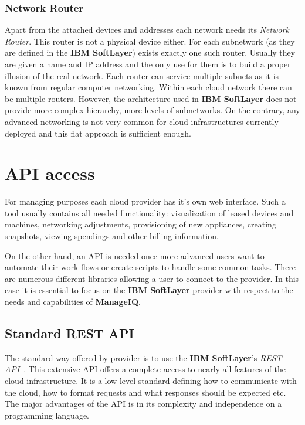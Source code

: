 \subsubsection{Network Router}
\label{subs:Network Router}

Apart from the attached devices and addresses each network needs its \emph{Network Router}. This router is not a physical device either. For each subnetwork (as they are defined in the \textbf{IBM SoftLayer}) exists exactly one such router. Usually they are given a name and IP address and the only use for them is to build a proper illusion of the real network. Each router can service multiple subnets as it is known from regular computer networking. Within each cloud network there can be multiple routers. However, the architecture used in \textbf{IBM SoftLayer} does not provide more complex hierarchy, more levels of subnetworks. On the contrary, any advanced networking is not very common for cloud infrastructures currently deployed and this flat approach is sufficient enough.

\section{API access}
\label{sec:API access}

For managing purposes each cloud provider has it's own web interface. Such a tool usually contains all needed functionality: visualization of leased devices and machines, networking adjustments, provisioning of new appliances, creating snapshots, viewing spendings and other billing information.

On the other hand, an API is needed once more advanced users want to automate their work flows or create scripts to handle some common tasks. There are numerous different libraries allowing a user to connect to the provider. In this case it is essential to focus on the \textbf{IBM SoftLayer} provider with respect to the needs and capabilities of \textbf{ManageIQ}.

\subsection{Standard REST API}
\label{sub:Standard REST API}

The standard way offered by provider is to use the \textbf{IBM SoftLayer}'s \emph{REST API}~\cite{restapi}. This extensive API offers a complete access to nearly all features of the cloud infrastructure. It is a low level standard defining how to communicate with the cloud, how to format requests and what responses should be expected etc. The major advantages of the API is in its complexity and independence on a programming language.

